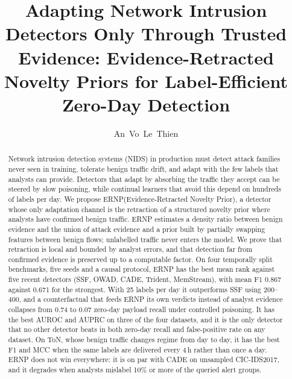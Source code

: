 \documentclass[a4paper,fleqn]{cas-dc}
\newcommand{\ERNP}{ERNP\xspace}
\begin{document}
\let\WriteBookmarks\relax
\def\floatpagepagefraction{1}
\def\textpagefraction{.001}


\title[mode=title]{Adapting Network Intrusion Detectors Only Through Trusted Evidence:
Evidence-Retracted Novelty Priors for Label-Efficient Zero-Day Detection}

\author[1]{An~Vo~Le~Thien}
\cormark[1]



\begin{abstract}
Network intrusion detection systems (NIDS) in production must detect attack families never seen in training, tolerate benign traffic drift, and adapt with the few labels that analysts can provide. Detectors that adapt by absorbing the traffic they accept can be steered by slow poisoning, while continual learners that avoid this depend on hundreds of labels per day. We propose \ERNP (Evidence-Retracted Novelty Prior), a detector whose only adaptation channel is the retraction of a structured novelty prior where analysts have confirmed benign traffic. \ERNP estimates a density ratio between benign evidence and the union of attack evidence and a prior built by partially swapping features between benign flows; unlabelled traffic never enters the model. We prove that retraction is local and bounded by analyst errors, and that detection far from confirmed evidence is preserved up to a computable factor. On four temporally split benchmarks, five seeds and a causal protocol, \ERNP has the best mean rank against five recent detectors (SSF, OWAD, CADE, Trident, MemStream), with mean F1 0.867 against 0.671 for the strongest. With 25 labels per day it outperforms SSF using 200--400, and a counterfactual that feeds \ERNP its own verdicts instead of analyst evidence collapses from 0.74 to 0.07 zero-day payload recall under controlled poisoning. It has the best AUROC and AUPRC on three of the four datasets, and it is the only detector that no other detector beats in both zero-day recall and false-positive rate on any dataset. On ToN, whose benign traffic changes regime from day to day, it has the best F1 and MCC when the same labels are delivered every 4\,h rather than once a day. \ERNP does not win everywhere: it is on par with CADE on unsampled CIC-IDS2017, and it degrades when analysts mislabel 10\% or more of the queried alert groups.
\end{abstract}
\end{document}
